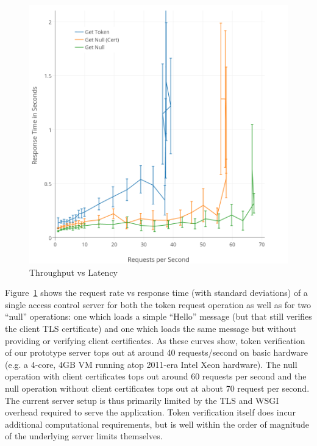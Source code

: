 \begin{figure}[th]
  \centering
  \includegraphics[width=\columnwidth]{./figs/png/chart-iops.png}
  \caption{Throughput vs Latency}
  \label{fig:eval:iops}
\end{figure}

Figure~\ref{fig:eval:iops} shows the request rate vs response time
(with standard deviations) of a single access control server for both
the token request operation as well as for two ``null'' operations:
one which loads a simple ``Hello'' message (but that still verifies
the client TLS certificate) and one which loads the same message but
without providing or verifying client certificates. As these curves
show, token verification of our prototype server tops out at around 40
requests/second on basic hardware (e.g. a 4-core, 4GB VM running atop
2011-era Intel Xeon hardware). The null operation with client
certificates tops out around 60 requests per second and the null
operation without client certificates tops out at about 70 request per
second. The current server setup is thus primarily limited by the TLS
and WSGI overhead required to serve the application. Token
verification itself does incur additional computational requirements,
but is well within the order of magnitude of the underlying server limits
themselves.


